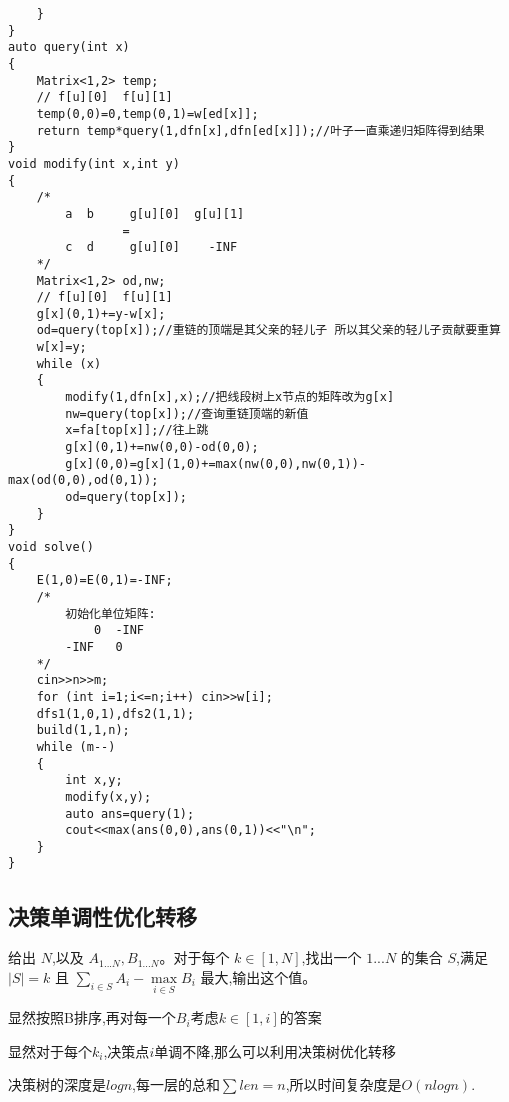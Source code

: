 \documentclass[a4paper]{ctexart}
\begin{document}
\begin{lstlisting}
    }
}
auto query(int x)
{
    Matrix<1,2> temp;
    // f[u][0]  f[u][1]
    temp(0,0)=0,temp(0,1)=w[ed[x]];
    return temp*query(1,dfn[x],dfn[ed[x]]);//叶子一直乘递归矩阵得到结果
}
void modify(int x,int y)
{
    /*
        a  b     g[u][0]  g[u][1]
                =
        c  d     g[u][0]    -INF
    */
    Matrix<1,2> od,nw;
    // f[u][0]  f[u][1]
    g[x](0,1)+=y-w[x];
    od=query(top[x]);//重链的顶端是其父亲的轻儿子 所以其父亲的轻儿子贡献要重算
    w[x]=y;
    while (x)
    {
        modify(1,dfn[x],x);//把线段树上x节点的矩阵改为g[x]
        nw=query(top[x]);//查询重链顶端的新值
        x=fa[top[x]];//往上跳
        g[x](0,1)+=nw(0,0)-od(0,0);
        g[x](0,0)=g[x](1,0)+=max(nw(0,0),nw(0,1))-max(od(0,0),od(0,1));
        od=query(top[x]);
    }
}
void solve()
{
    E(1,0)=E(0,1)=-INF;
    /*
        初始化单位矩阵:
            0  -INF
        -INF   0
    */
    cin>>n>>m;
    for (int i=1;i<=n;i++) cin>>w[i];
    dfs1(1,0,1),dfs2(1,1);
    build(1,1,n);
    while (m--)
    {
        int x,y;
        modify(x,y);
        auto ans=query(1);
        cout<<max(ans(0,0),ans(0,1))<<"\n";
    }
}
\end{lstlisting}

\subsection{决策单调性优化转移}

给出 $N$,以及 $A_{1...N},B_{1...N}$。对于每个 $k\in [1,N]$,找出一个 $1...N$ 的集合 $S$,满足 $|S|=k$ 且 $\sum\limits_{i\in S}A_i-\max\limits_{i\in S}B_i$ 最大,输出这个值。

显然按照B排序,再对每一个$B_i$考虑$k\in [1,i]$的答案

显然对于每个$k_i$,决策点$i$单调不降,那么可以利用决策树优化转移

决策树的深度是$logn$,每一层的总和$\sum len=n$,所以时间复杂度是$O(nlogn)$.
\end{document}
